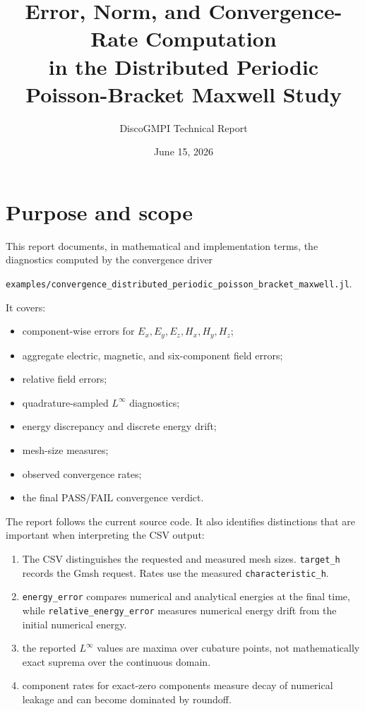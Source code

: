 \documentclass[11pt]{article}
\title{Error, Norm, and Convergence-Rate Computation\\
in the Distributed Periodic Poisson-Bracket Maxwell Study}
\author{DiscoGMPI Technical Report}
\date{June 15, 2026}
\newcommand{\code}[1]{\nolinkurl{#1}}
\begin{document}
\maketitle
\tableofcontents
\newpage

\section{Purpose and scope}

This report documents, in mathematical and implementation terms, the
diagnostics computed by the convergence driver
\begin{center}
\code{examples/convergence_distributed_periodic_poisson_bracket_maxwell.jl}.
\end{center}
It covers:
\begin{itemize}[leftmargin=*]
  \item component-wise errors for
        \(E_x,E_y,E_z,H_x,H_y,H_z\);
  \item aggregate electric, magnetic, and six-component field errors;
  \item relative field errors;
  \item quadrature-sampled \(L^\infty\) diagnostics;
  \item energy discrepancy and discrete energy drift;
  \item mesh-size measures;
  \item observed convergence rates;
  \item the final PASS/FAIL convergence verdict.
\end{itemize}

The report follows the current source code. It also identifies distinctions
that are important when interpreting the CSV output:
\begin{enumerate}[leftmargin=*]
  \item The CSV distinguishes the requested and measured mesh sizes.
        \code{target_h} records the Gmsh request. Rates use the measured
        \code{characteristic_h}.
  \item \code{energy_error} compares numerical and analytical energies at the
        final time, while \code{relative_energy_error} measures numerical
        energy drift from the initial numerical energy.
  \item the reported \(L^\infty\) values are maxima over cubature points, not
        mathematically exact suprema over the continuous domain.
  \item component rates for exact-zero components measure decay of numerical
        leakage and can become dominated by roundoff.
\end{enumerate}
\end{document}
